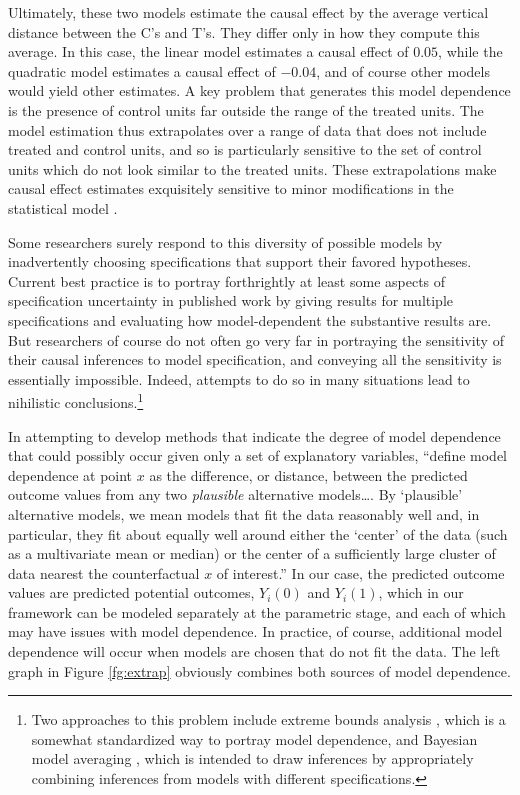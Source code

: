 \documentclass[11pt,titlepage]{article}
\begin{document}
Ultimately, these two models estimate the causal effect by the average
vertical distance between the C's and T's.  They differ only in how
they compute this average.  In this case, the linear model estimates a
causal effect of $0.05$, while the quadratic model estimates a causal
effect of $-0.04$, and of course other models would yield other
estimates.  A key problem that generates this model dependence is the
presence of control units far outside the range of the treated units.
The model estimation thus extrapolates over a range of data that does
not include treated and control units, and so is particularly
sensitive to the set of control units which do not look similar to the
treated units.  These extrapolations make causal effect estimates
exquisitely sensitive to minor modifications in the statistical model
\citep{KinZen06b}.

Some researchers surely respond to this diversity of possible models
by inadvertently choosing specifications that support their favored
hypotheses.  Current best practice is to portray forthrightly at least
some aspects of specification uncertainty in published work by giving
results for multiple specifications and evaluating how model-dependent
the substantive results are.  But researchers of course do not often
go very far in portraying the sensitivity of their causal inferences
to model specification, and conveying all the sensitivity is
essentially impossible.  Indeed, attempts to do so in many situations
lead to nihilistic conclusions.\footnote{Two approaches to this
  problem include extreme bounds analysis \citep{Leamer78}, which is a
  somewhat standardized way to portray model dependence, and Bayesian
  model averaging \citep{HoeMadRaf99,ImaKin04}, which is intended to
  draw inferences by appropriately combining inferences from models
  with different specifications.}

In attempting to develop methods that indicate the degree of model
dependence that could possibly occur given only a set of explanatory
variables, \citet{KinZen06a} ``define model dependence at point $x$ as
the difference, or distance, between the predicted outcome values from
any two \emph{plausible} alternative models\dots.  By `plausible'
alternative models, we mean models that fit the data reasonably well
and, in particular, they fit about equally well around either the
`center' of the data (such as a multivariate mean or median) or the
center of a sufficiently large cluster of data nearest the
counterfactual $x$ of interest.''  In our case, the predicted outcome
values are predicted potential outcomes, $Y_i(0)$ and $Y_i(1)$, which
in our framework can be modeled separately at the parametric stage,
and each of which may have issues with model dependence.  In practice,
of course, additional model dependence will occur when models are
chosen that do not fit the data.  The left graph in Figure
\ref{fg:extrap} obviously combines both sources of model dependence.
\end{document}
